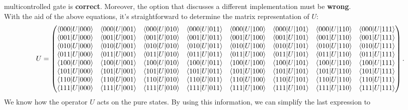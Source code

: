 \documentclass[10pt]{article}
\begin{document}
multicontrolled gate is \textbf{correct}. Moreover, the option that discusses a
different implementation must be \textbf{wrong}.\\
With the aid of the above equations, it's straightforward to determine the
matrix representation of \(U\):
\begin{equation}
U=
  \begin{pmatrix}
    \braket{000|U|000} & \braket{000|U|001} & \braket{000|U|010} & \braket{000|U|011} & \braket{000|U|100} & \braket{000|U|101} & \braket{000|U|110} & \braket{000|U|111}\\
    \braket{001|U|000} & \braket{001|U|001} & \braket{001|U|010} & \braket{001|U|011} & \braket{001|U|100} & \braket{001|U|101} & \braket{001|U|110} & \braket{001|U|111}\\
    \braket{010|U|000} & \braket{010|U|001} & \braket{010|U|010} & \braket{010|U|011} & \braket{010|U|100} & \braket{010|U|101} & \braket{010|U|110} & \braket{010|U|111}\\
    \braket{011|U|000} & \braket{011|U|001} & \braket{011|U|010} & \braket{011|U|011} & \braket{011|U|100} & \braket{011|U|101} & \braket{011|U|110} & \braket{011|U|111}\\
    \braket{100|U|000} & \braket{100|U|001} & \braket{100|U|010} & \braket{100|U|011} & \braket{100|U|100} & \braket{100|U|101} & \braket{100|U|110} & \braket{100|U|111}\\
    \braket{101|U|000} & \braket{101|U|001} & \braket{101|U|010} & \braket{101|U|011} & \braket{101|U|100} & \braket{101|U|101} & \braket{101|U|110} & \braket{101|U|111}\\
    \braket{110|U|000} & \braket{110|U|001} & \braket{110|U|010} & \braket{110|U|011} & \braket{110|U|100} & \braket{110|U|101} & \braket{110|U|110} & \braket{110|U|111}\\
    \braket{111|U|000} & \braket{111|U|001} & \braket{111|U|010} & \braket{111|U|011} & \braket{111|U|100} & \braket{111|U|101} & \braket{111|U|110} & \braket{111|U|111}
  \end{pmatrix}.
\end{equation}
We know how the operator \(U\) acts on the pure states. By using this
information, we can simplify the last expression to
\end{document}

